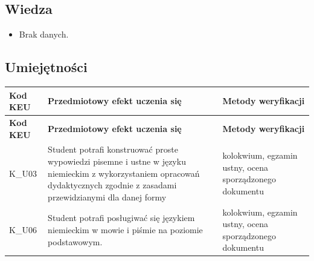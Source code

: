 \documentclass[12pt, a4paper]{article}
\newcommand{\thdrule}{\noalign{\global\setlength{\extrarowheight}{0pt}}}
\newcommand{\thdend}{\noalign{\global\setlength{\extrarowheight}{3pt}}}
\begin{document}
\subsection*{Wiedza}
\begin{itemize}
  \item Brak danych.
\end{itemize}

\subsection*{Umiejętności}
{\scriptsize
\begin{longtable}{m{1.6cm}m{9.0cm}m{4.2cm}}
\thdrule\toprule
\rowcolor{pjatkRed} {\color{white}\footnotesize\textbf{\vphantom{Ag}Kod KEU}} & {\color{white}\footnotesize\textbf{\vphantom{Ag}Przedmiotowy efekt uczenia się}} & {\color{white}\footnotesize\textbf{\vphantom{Ag}Metody weryfikacji}} \\
\midrule\thdend
\endfirsthead
\thdrule\toprule
\rowcolor{pjatkRed} {\color{white}\footnotesize\textbf{\vphantom{Ag}Kod KEU}} & {\color{white}\footnotesize\textbf{\vphantom{Ag}Przedmiotowy efekt uczenia się}} & {\color{white}\footnotesize\textbf{\vphantom{Ag}Metody weryfikacji}} \\
\midrule\thdend
\endhead
  \rowcolor{tableRowLight} K\_U03 & Student potrafi konstruować proste wypowiedzi pisemne i ustne w języku niemieckim z wykorzystaniem opracowań dydaktycznych zgodnie z zasadami przewidzianymi dla danej formy & kolokwium, egzamin ustny, ocena sporządzonego dokumentu \\
  \rowcolor{tableRowAlt} K\_U06 & Student potrafi posługiwać się językiem niemieckim w mowie i piśmie na poziomie podstawowym. & kolokwium, egzamin ustny, ocena sporządzonego dokumentu \\
\bottomrule
\end{longtable}}
\end{document}
